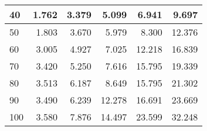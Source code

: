 \begin{table}[h]
\begin{tabular}{|l|r|r|r|r|r|}
40                               & 1.762           & 3.379            & 5.099            & 6.941            & 9.697            \\ \hline
50                               & 1.803           & 3.670            & 5.979            & 8.300            & 12.376           \\ \hline
60                               & 3.005           & 4.927            & 7.025            & 12.218           & 16.839           \\ \hline
70                               & 3.420           & 5.250            & 7.616            & 15.795           & 19.339           \\ \hline
80                               & 3.513           & 6.187            & 8.649            & 15.795           & 21.302           \\ \hline
90                               & 3.490           & 6.239            & 12.278           & 16.691           & 23.669           \\ \hline
100                              & 3.580           & 7.876            & 14.497           & 23.599           & 32.248           \\ \hline
\end{tabular}
\end{table}

